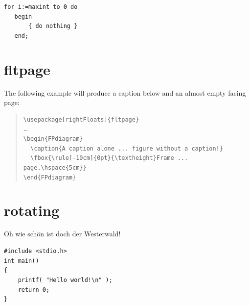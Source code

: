 \documentclass{article}
\begin{document}
   \begin{lstlisting}[caption={Useless code},label=useless1,captionpos=t]
   for i:=maxint to 0 do
   begin
       { do nothing }
   end;
   \end{lstlisting}

\ifdefined\SCdiagram
\chapter{fltpage}

The following example will produce a caption below and an almost empty facing
page:
\begin{FPdiagram}
 \caption[A caption alone on a page]%
         {A caption alone on a page will belong to the
          following figure without a caption!}
 \newlength\tempdima
 \setlength\tempdima\textheight
 \addtolength\tempdima{-7pt}%
\end{FPdiagram}
\begin{quote}
  \verb|\usepackage[rightFloats]{fltpage}|\\
  \ldots\\
  \verb|\begin{FPdiagram}|\\
  \verb|  \caption{A caption alone ... figure without a caption!}|\\
  \verb|  \fbox{\rule[-10cm]{0pt}{\textheight}Frame ... page.\hspace{5cm}}|\\
  \verb|\end{FPdiagram}|
\end{quote}
\fi

\ifdefined\sidewaysdiagram
\chapter{rotating}

\begin{sidewaysdiagram}
\centering
\strut Oh wie sch\"on ist doch der Westerwald!
\caption{A sidewaysdiagram}
\end{sidewaysdiagram}
\begin{sidewaysprogram}
  \verb|#include <stdio.h>|\\
  \verb|int main()|\\
  \verb|{|\\
  \verb|    printf( "Hello world!\n" );|\\
  \verb|    return 0;|\\
  \verb|}|
  \caption{A very simple C program}
\end{sidewaysprogram}
\fi
\end{document}
